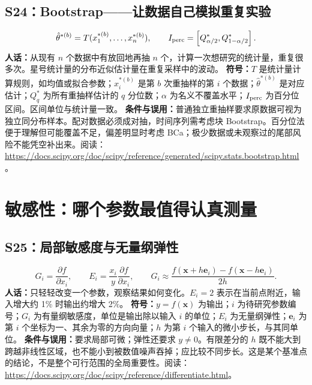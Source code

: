 \documentclass[UTF8,zihao=-4,openany,oneside,fontset=windows]{ctexbook}
\begin{document}
\subsection{S24：Bootstrap——让数据自己模拟重复实验}
\begin{equation}
 \hat\theta^{*(b)}=T(x_1^{*(b)},\ldots,x_n^{*(b)}),\qquad
 I_{\rm perc}=\left[Q^*_{\alpha/2},Q^*_{1-\alpha/2}\right].
\end{equation}
\textbf{人话：}从现有 $n$ 个数据中有放回地再抽 $n$ 个，计算一次想研究的统计量，重复很多次。星号统计量的分布近似估计量在重复采样中的波动。
\textbf{符号：}$T$ 是统计量计算规则，如均值或拟合参数；$x_i^{*(b)}$ 是第 $b$ 次重抽样的第 $i$ 个数据；$\hat\theta^{*(b)}$ 是对应估计；$Q_q^*$ 为所有重抽样估计的 $q$ 分位数；$\alpha$ 为名义不覆盖水平；$I_{\rm perc}$ 为百分位区间。区间单位与统计量一致。
\textbf{条件与误用：}普通独立重抽样要求原数据可视为独立同分布样本。配对数据必须成对抽，时间序列需考虑块 Bootstrap。百分位法便于理解但可能覆盖不足，偏差明显时考虑 BCa；极少数据或未观察过的尾部风险不能凭空补出来。阅读：\url{https://docs.scipy.org/doc/scipy/reference/generated/scipy.stats.bootstrap.html}。

\section{敏感性：哪个参数最值得认真测量}
\subsection{S25：局部敏感度与无量纲弹性}
\begin{equation}
 G_i=\frac{\partial f}{\partial x_i},\qquad
 E_i=\frac{x_i}{y}\frac{\partial f}{\partial x_i},\qquad
 G_i\approx\frac{f(\mathbf x+h\mathbf e_i)-f(\mathbf x-h\mathbf e_i)}{2h}.
\end{equation}
\textbf{人话：}只轻轻改变一个参数，观察结果如何变化。$E_i=2$ 表示在当前点附近，输入增大约 1\% 时输出约增大 2\%。
\textbf{符号：}$y=f(\mathbf x)$ 为输出；$i$ 为待研究参数编号；$G_i$ 为有量纲敏感度，单位是输出除以输入 $i$ 的单位；$E_i$ 为无量纲弹性；$\mathbf e_i$ 为第 $i$ 个坐标为一、其余为零的方向向量；$h$ 为第 $i$ 个输入的微小步长，与其同单位。
\textbf{条件与误用：}要求局部可微；弹性还要求 $y\ne0$。有限差分的 $h$ 既不能大到跨越非线性区域，也不能小到被数值噪声吞掉；应比较不同步长。这是某个基准点的结论，不是整个可行范围的全局重要性。阅读：\url{https://docs.scipy.org/doc/scipy/reference/differentiate.html}。
\end{document}
